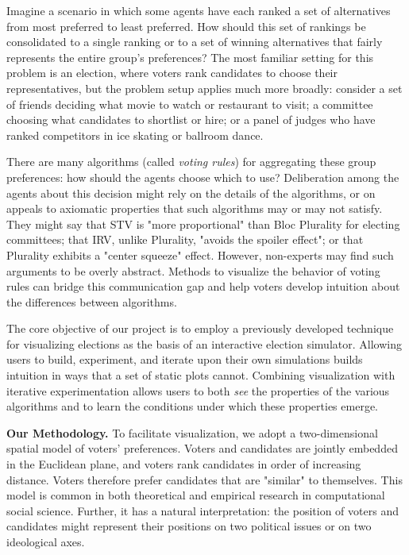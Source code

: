 
Imagine a scenario in which some agents have each ranked a set of alternatives
from most preferred to least preferred.
How should this set of rankings be consolidated to a single ranking
or to a set of winning alternatives that fairly represents the entire group's preferences?
The most familiar setting for this problem is an election,
where voters rank candidates to choose their representatives,
but the problem setup applies much more broadly:
consider
a set of friends deciding what movie to watch or restaurant to visit;
a committee choosing what candidates to shortlist or hire; or
a panel of judges who have ranked competitors in ice skating or ballroom dance.

There are many algorithms (called \textit{voting rules}) for aggregating these group preferences:
how should the agents choose which to use?
Deliberation among the agents about this decision might rely on the details of the algorithms,
or on appeals to axiomatic properties that such algorithms may or may not satisfy.
They might say that STV is "more proportional" than Bloc Plurality for electing committees;
that IRV, unlike Plurality, "avoids the spoiler effect";
or that Plurality exhibits a "center squeeze" effect.
However, non-experts may find such arguments to be overly abstract.
Methods to visualize the behavior of voting rules can bridge this communication gap
and help voters develop intuition about the differences between algorithms.

The core objective of our project is to employ a previously developed technique
for visualizing elections as the basis of an interactive election simulator.
Allowing users to build, experiment, and iterate upon their own simulations
builds intuition in ways that a set of static plots cannot.
Combining visualization with iterative experimentation
allows users to both \textit{see} the properties of the various algorithms
and to learn the conditions under which these properties emerge.

\vspace{ 1em }
\textbf{Our Methodology.}
To facilitate visualization, we adopt a two-dimensional spatial model of voters' preferences.
Voters and candidates are jointly embedded in the Euclidean plane,
and voters rank candidates in order of increasing distance.
Voters therefore prefer candidates that are "similar" to themselves.
This model is common in both theoretical \cite{spatial}
and empirical \cite{guide} research in computational social science.
Further, it has a natural interpretation:
the position of voters and candidates might represent their
positions on two political issues or on two ideological axes.

